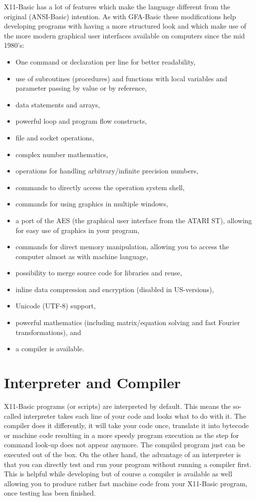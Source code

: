 X11-Basic has a lot of features which make the language different from the
original (ANSI-Basic) intention. As with GFA-Basic these modifications help
developing programs with having a more structured look and which make use of
the more modern graphical user interfaces available on computers since the mid
1980's:
\begin{itemize} 
\item One command or declaration per line for better readability,
\item use of subroutines (procedures) and functions with local variables and 
      parameter passing by value or by reference,
\item data statements and arrays,
\item powerful loop and program flow constructs,
\item file and socket operations,
\item complex number mathematics,
\item operations for handling arbitrary/infinite precision numbers, 
\item commands to directly access the operation system shell,  
\item commands for using graphics in multiple windows,
\item a port of the AES (the graphical user interface 
from the ATARI ST), allowing for easy use of graphics in your program, 
\item  commands for direct memory manipulation, allowing you to access the 
computer almost as with machine language, 
\item possibility to merge source code for libraries and reuse,  
\item inline data compression and encryption (disabled in US-versions), 
\item Unicode (UTF-8) support, 
\item powerful mathematics (including matrix/equation solving and fast Fourier 
transformations), and 
\item a compiler is available.
\end{itemize}

\section*{Interpreter and Compiler}

X11-Basic programs (or scripts) are interpreted by default. This means the
so-called interpreter takes each line of your code and looks what to do with it.
The compiler does it differently, it will take your code once, translate it into
bytecode or machine code resulting in a more speedy program execution as the
step for command look-up does not appear anymore. The compiled program just can
be executed out of the box. On the other hand, the advantage of an interpreter
is that you can directly test and run your program without running a compiler
first. This is helpful while developing but of course a compiler is available
as well allowing you to produce rather fast machine code from your X11-Basic
program, once testing has been finished.


